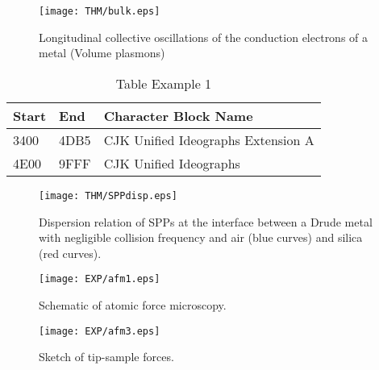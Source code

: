 \renewcommand{\thefigure}{\Alph{chapter}.\arabic{figure}} 
\renewcommand{\thetable}{\Alph{chapter}.\arabic{table}}
\setcounter{chapter}{3}%
\setcounter{figure}{1}  %
\setcounter{table}{1}  %

\begin{figure}[!]
\centering
\texttt{[image: THM/bulk.eps]}
\caption{\label{fig:bulk}Longitudinal collective oscillations of the conduction electrons of a metal (Volume plasmons)}
\end{figure}

\begin{table}[!]\begin{center}
\caption{Table Example 1}
\begin{tabularx}{8cm}{llX}
\hline
Start & End  & Character Block Name \\
\hline
3400  & 4DB5 & CJK Unified Ideographs Extension A \\
4E00  & 9FFF & CJK Unified Ideographs \\
\hline
\end{tabularx}
\end{center}\end{table}

\begin{figure}[!]
\centering
\texttt{[image: THM/SPPdisp.eps]}
\caption{\label{fig:SPPdisp}Dispersion relation of SPPs at the interface between a Drude metal with negligible collision frequency and air (blue curves) and silica (red curves).}
\end{figure}

\setcounter{chapter}{4}  %
\setcounter{figure}{1}  %

\begin{figure}[!]
\centering
\texttt{[image: EXP/afm1.eps]}
\caption{\label{fig:afm1}Schematic of atomic force microscopy.}
\end{figure}

\begin{figure}[!]
\centering
\texttt{[image: EXP/afm3.eps]}
\caption{\label{fig:afm3}Sketch of tip-sample forces.}
\end{figure}